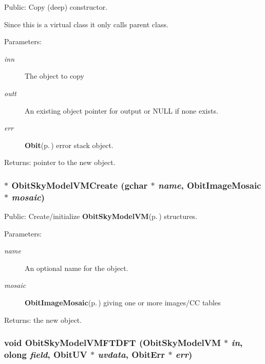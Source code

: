 Public: Copy (deep) constructor. 

Since this is a virtual class it only calls parent class. \begin{Desc}
\item[Parameters:]
\begin{description}
\item[{\em inn}]The object to copy \item[{\em outt}]An existing object pointer for output or NULL if none exists. \item[{\em err}]{\bf Obit}{\rm (p.\,\pageref{structObit})} error stack object. \end{description}
\end{Desc}
\begin{Desc}
\item[Returns:]pointer to the new object. \end{Desc}
\subsubsection{$\ast$ Obit\-Sky\-Model\-VMCreate (gchar $\ast$ {\em name}, {\bf Obit\-Image\-Mosaic} $\ast$ {\em mosaic})}\label{ObitSkyModelVM_8c_a15}


Public: Create/initialize {\bf Obit\-Sky\-Model\-VM}{\rm (p.\,\pageref{structObitSkyModelVM})} structures. 

\begin{Desc}
\item[Parameters:]
\begin{description}
\item[{\em name}]An optional name for the object. \item[{\em mosaic}]{\bf Obit\-Image\-Mosaic}{\rm (p.\,\pageref{structObitImageMosaic})} giving one or more images/CC tables \end{description}
\end{Desc}
\begin{Desc}
\item[Returns:]the new object. \end{Desc}
\subsubsection{\setlength{\rightskip}{0pt plus 5cm}void Obit\-Sky\-Model\-VMFTDFT ({\bf Obit\-Sky\-Model\-VM} $\ast$ {\em in}, {\bf olong} {\em field}, {\bf Obit\-UV} $\ast$ {\em uvdata}, {\bf Obit\-Err} $\ast$ {\em err})}\label{ObitSkyModelVM_8c_a4}


